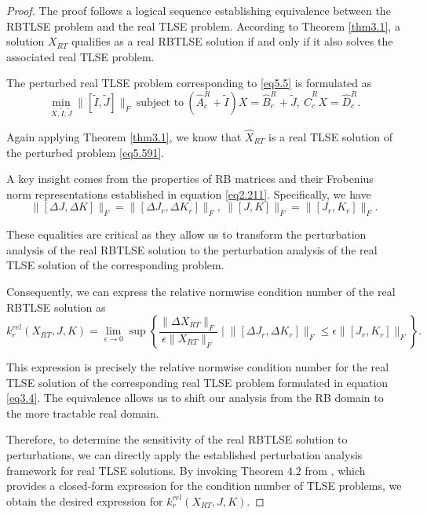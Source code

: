 \documentclass[preprint,11pt,3p]{elsarticle}
\begin{document}
\begin{proof}
The proof follows a logical sequence establishing equivalence between the RBTLSE problem and the real TLSE problem. According to Theorem \ref{thm3.1}, a solution $X_{RT}$ qualifies as a real RBTLSE solution if and only if it also solves the associated real TLSE problem. 
	
	The perturbed real TLSE problem corresponding to \eqref{eq5.5} is formulated as
	\begin{equation}\label{eq5.591}
		\min_{X,\tilde{I},\tilde{J}}\|[\tilde{I}, \tilde{J}]\|_F ~ \text{subject to} ~ (\widehat{A}^R_c+\tilde{I})X = \widehat{B}^R_c+\tilde{J}, ~ \widehat{C}^R_cX=\widehat{D}^R_c.
	\end{equation}
	
	Again applying Theorem \ref{thm3.1}, we know that $\widehat{X}_{RT}$ is a real TLSE solution of the perturbed problem \eqref{eq5.591}. 
	
	A key insight comes from the properties of RB matrices and their Frobenius norm representations established in equation \eqref{eq2.211}. Specifically, we have
	\begin{equation}\label{eq5.597}
		\|[\Delta J, \Delta K]\|_F = \|[\Delta J_r, \Delta K_r]\|_F, ~ \|[J, K]\|_F = \|[J_r, K_r]\|_F.
	\end{equation}
	
	These equalities are critical as they allow us to transform the perturbation analysis of the real RBTLSE solution to the perturbation analysis of the real TLSE solution of the corresponding problem. 
	
	Consequently, we can express the relative normwise condition number of the real RBTLSE solution as
	\begin{equation*}
		\mathit{k}^{rel}_{r}(X_{RT},J,K) = \lim_{\epsilon \rightarrow 0} \sup \left\{\frac{\|\Delta X_{RT}\|_F}{\epsilon \|X_{RT}\|_F} \; \Bigg| \; \|[\Delta J_r, \Delta K_r]\|_F \leq \epsilon \|[J_r, K_r]\|_F\right\}.
	\end{equation*}
	
	This expression is precisely the relative normwise condition number for the real TLSE solution of the corresponding real TLSE problem formulated in equation \eqref{eq3.4}. The equivalence allows us to shift our analysis from the RB domain to the more tractable real domain.
	
	Therefore, to determine the sensitivity of the real RBTLSE solution to perturbations, we can directly apply the established perturbation analysis framework for real TLSE solutions. By invoking Theorem $4.2$ from \cite{MR4371085}, which provides a closed-form expression for the condition number of TLSE problems, we obtain the desired expression for $\mathit{k}^{rel}_{r}(X_{RT},J,K)$.
\end{proof}
\end{document}
